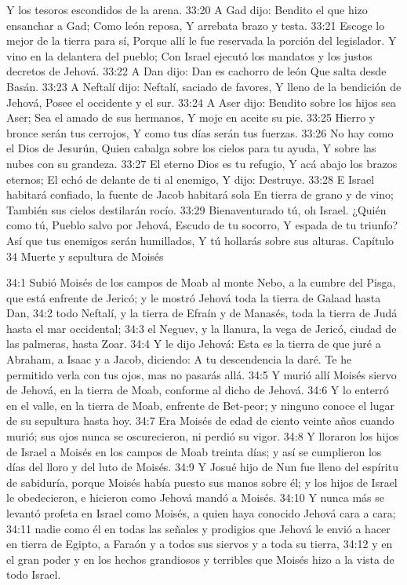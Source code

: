 Y los tesoros escondidos de la arena.  
33:20 A Gad dijo:  
Bendito el que hizo ensanchar a Gad;  
Como león reposa,  
Y arrebata brazo y testa.  
33:21 Escoge lo mejor de la tierra para sí,  
Porque allí le fue reservada la porción del legislador.  
Y vino en la delantera del pueblo;  
Con Israel ejecutó los mandatos y los justos decretos de Jehová.  
33:22 A Dan dijo:  
Dan es cachorro de león  
Que salta desde Basán.  
33:23 A Neftalí dijo:  
Neftalí, saciado de favores,  
Y lleno de la bendición de Jehová,  
Posee el occidente y el sur.  
33:24 A Aser dijo:  
Bendito sobre los hijos sea Aser;  
Sea el amado de sus hermanos,  
Y moje en aceite su pie.  
33:25 Hierro y bronce serán tus cerrojos,  
Y como tus días serán tus fuerzas.  
33:26 No hay como el Dios de Jesurún,  
Quien cabalga sobre los cielos para tu ayuda,  
Y sobre las nubes con su grandeza.  
33:27 El eterno Dios es tu refugio,  
Y acá abajo los brazos eternos;  
El echó de delante de ti al enemigo, 
Y dijo: Destruye.  
33:28 E Israel habitará confiado, la fuente de Jacob habitará sola  
En tierra de grano y de vino;  
También sus cielos destilarán rocío.  
33:29 Bienaventurado tú, oh Israel.  
¿Quién como tú,  
Pueblo salvo por Jehová,  
Escudo de tu socorro,  
Y espada de tu triunfo?  
Así que tus enemigos serán humillados,  
Y tú hollarás sobre sus alturas.  
Capítulo 34 
Muerte y sepultura de Moisés  

34:1 Subió Moisés de los campos de Moab al monte Nebo, a la cumbre del Pisga, que está enfrente de Jericó; y le mostró Jehová toda la tierra de Galaad hasta Dan,  
34:2 todo Neftalí, y la tierra de Efraín y de Manasés, toda la tierra de Judá hasta el mar occidental;  
34:3 el Neguev, y la llanura, la vega de Jericó, ciudad de las palmeras, hasta Zoar.  
34:4 Y le dijo Jehová: Esta es la tierra de que juré a Abraham, a Isaac y a Jacob, diciendo: A tu descendencia la daré. Te he permitido verla con tus ojos, mas no pasarás allá.  
34:5 Y murió allí Moisés siervo de Jehová, en la tierra de Moab, conforme al dicho de Jehová.  
34:6 Y lo enterró en el valle, en la tierra de Moab, enfrente de Bet-peor; y ninguno conoce el lugar de su sepultura hasta hoy.  
34:7 Era Moisés de edad de ciento veinte años cuando murió; sus ojos nunca se oscurecieron, ni perdió su vigor.  
34:8 Y lloraron los hijos de Israel a Moisés en los campos de Moab treinta días; y así se cumplieron los días del lloro y del luto de Moisés.  
34:9 Y Josué hijo de Nun fue lleno del espíritu de sabiduría, porque Moisés había puesto sus manos sobre él; y los hijos de Israel le obedecieron, e hicieron como Jehová mandó a Moisés.  
34:10 Y nunca más se levantó profeta en Israel como Moisés, a quien haya conocido Jehová cara a cara; 
34:11 nadie como él en todas las señales y prodigios que Jehová le envió a hacer en tierra de Egipto, a Faraón y a todos sus siervos y a toda su tierra,  
34:12 y en el gran poder y en los hechos grandiosos y terribles que Moisés hizo a la vista de todo Israel.
